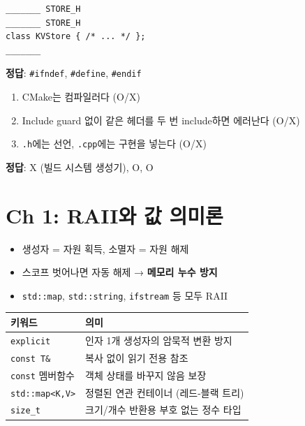 \documentclass[11pt,a4paper]{article}
\newcommand{\code}[1]{\texttt{#1}}
\begin{document}
\begin{quizbox}[title={Q0-2: Include Guard}]
\begin{lstlisting}[style=cpp,numbers=none]
_______ STORE_H
_______ STORE_H
class KVStore { /* ... */ };
_______
\end{lstlisting}
\textbf{정답}: \code{\#ifndef}, \code{\#define}, \code{\#endif}
\end{quizbox}

\begin{quizbox}[title={Q0-3: O/X}]
\begin{enumerate}[nosep]
\item CMake는 컴파일러다 (O/X)
\item Include guard 없이 같은 헤더를 두 번 include하면 에러난다 (O/X)
\item \code{.h}에는 선언, \code{.cpp}에는 구현을 넣는다 (O/X)
\end{enumerate}
\textbf{정답}: X (빌드 시스템 생성기), O, O
\end{quizbox}


\section{Ch 1: RAII와 값 의미론}

\begin{conceptbox}[title={RAII (Resource Acquisition Is Initialization)}]
\begin{itemize}[nosep]
\item 생성자 = 자원 획득, 소멸자 = 자원 해제
\item 스코프 벗어나면 자동 해제 → \textbf{메모리 누수 방지}
\item \code{std::map}, \code{std::string}, \code{ifstream} 등 모두 RAII
\end{itemize}
\end{conceptbox}

\begin{tabularx}{\textwidth}{@{}lX@{}}
\toprule
\textbf{키워드} & \textbf{의미} \\
\midrule
\code{explicit} & 인자 1개 생성자의 암묵적 변환 방지 \\
\code{const T\&} & 복사 없이 읽기 전용 참조 \\
\code{const} 멤버함수 & 객체 상태를 바꾸지 않음 보장 \\
\code{std::map<K,V>} & 정렬된 연관 컨테이너 (레드-블랙 트리) \\
\code{size\_t} & 크기/개수 반환용 부호 없는 정수 타입 \\
\bottomrule
\end{tabularx}
\end{document}
